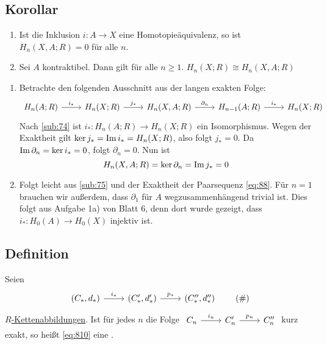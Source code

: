 \subsection[Korollar: Hologiemodul wenn $A$ kontraktibel ist]{Korollar} %
\label{sub:89}
\begin{enumerate}[(1)]
	\item Ist die Inklusion $i \colon A \to X$ eine Homotopieäquivalenz, so ist $H_n(X,A;R)= 0$ für alle $n$.
	\item Sei $A$ kontraktibel. Dann gilt für alle $n \ge 1$. $H_n(X;R) \cong H_n(X,A;R)$
\end{enumerate}
\begin{enumerate}[(1)]
	\item Betrachte den folgenden Ausschnitt aus der langen exakten Folge:
	\[
		\begin{tikzcd}
			H_n(A;R) \rar["i_*"] & H_n(X;R) \rar["j_*"] & H_n(X,A;R) \rar["\partial_n"] & H_{n-1}(A;R) \rar["i_*"] & H_n(X;R)
		\end{tikzcd}
	\]
	Nach \ref{sub:74} ist $i_* : H_n(A;R) \to H_n(X;R)$ ein Isomorphismus. Wegen der Exaktheit gilt
	$\ker j_* = \operatorname{Im} i_* = H_n(X;R)$, also folgt $j_* = 0$. Da $\operatorname{Im} \partial_n = \ker i_* = 0$, folgt $\partial_n=0$. Nun ist 
	\[
		H_n(X,A;R) = \ker \partial_n = \operatorname{Im} j_* = 0
	\]
	\item Folgt leicht aus \ref{sub:75} und der Exaktheit der Paarsequenz \eqref{eq:88}. Für $n=1$ brauchen wir außerdem, dass $\partial_1$ für $A$ wegzusammenhängend
	trivial ist. Dies folgt aus Aufgabe 1a) von Blatt 6, denn dort wurde gezeigt, dass $i_* : H_0(A) \to H_0(X)$ injektiv ist. \bewende
\end{enumerate}

\subsection[Definition: Kurze exakte Folge von Kettenkomplexen]{Definition} %
\label{sub:810}
Seien 
\begin{equation*}
	\begin{tikzcd}
		(C_*,d_*) \rar["i_*"] & (C_*',d_*') \rar["p_*"] & (C_*'',d_*'') 
	\end{tikzcd} \label{eq:810}\tag{\#}
\end{equation*}
\hyperref[sub:61]{$R$-Kettenabbildungen}. Ist für jedes $n$ die Folge
\(
	\begin{tikzcd}
		C_n \rar["i_n"] & C_n' \rar["p_n"] & C_n''
	\end{tikzcd}
\)
kurz exakt, so heißt \eqref{eq:810} eine .

